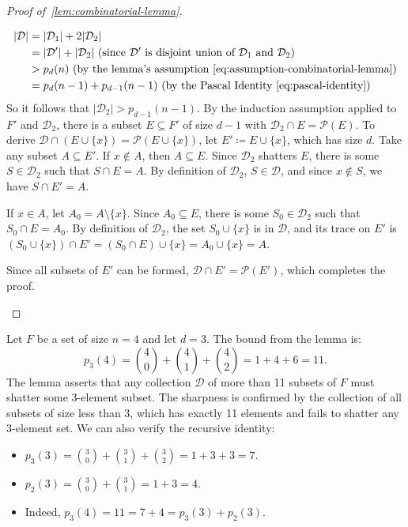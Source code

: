 \begin{proof}[Proof of~\ref{lem:combinatorial-lemma}]
\begin{enumerate}[label=(\roman*)]
\[\begin{aligned}
                |\mathcal{D}| &= |\mathcal{D}_1| + 2|\mathcal{D}_2| \\
                &= |\mathcal{D}'| + |\mathcal{D}_2| \textrm{ (since $\mathcal{D}'$ is disjoint union of $\mathcal{D}_1$ and $\mathcal{D}_2$)} \\
                &> p_d(n) \textrm{ (by the lemma's assumption~\ref{eq:assumption-combinatorial-lemma})} \\
                &= p_d(n-1) + p_{d-1}(n-1) \textrm{ (by the Pascal Identity~\ref{eq:pascal-identity})} \\
            \end{aligned}
        \]
        So it follows that $|\mathcal{D}_2| > p_{d-1}(n-1)$. By the induction assumption applied to $F'$ and $\mathcal{D}_2$, there is a subset $E \subseteq F'$ of size $d-1$ with $\mathcal{D}_2 \cap E = \mathcal{P}(E)$. To derive $\mathcal{D} \cap (E \cup \{x\}) = \mathcal{P}(E \cup \{x\})$, let $E' \coloneq E \cup \{x\}$, which has size $d$. Take any subset $A \subseteq E'$.
        If $x \notin A$, then $A \subseteq E$. Since $\mathcal{D}_2$ shatters $E$, there is some $S \in \mathcal{D}_2$ such that $S \cap E = A$. By definition of $\mathcal{D}_2$, $S \in \mathcal{D}$, and since $x \notin S$, we have $S \cap E' = A$.

        If $x \in A$, let $A_0 = A \setminus \{x\}$. Since $A_0 \subseteq E$, there is some $S_0 \in \mathcal{D}_2$ such that $S_0 \cap E = A_0$. By definition of $\mathcal{D}_2$, the set $S_0 \cup \{x\}$ is in $\mathcal{D}$, and its trace on $E'$ is $(S_0 \cup \{x\}) \cap E' = (S_0 \cap E) \cup \{x\} = A_0 \cup \{x\} = A$.

        Since all subsets of $E'$ can be formed, $\mathcal{D} \cap E' = \mathcal{P}(E')$, which completes the proof.
    \end{enumerate}
\end{proof}

\begin{example}
    Let $F$ be a set of size $n=4$ and let $d=3$. The bound from the lemma is:
    \[
        p_3(4) = \binom{4}{0} + \binom{4}{1} + \binom{4}{2} = 1 + 4 + 6 = 11.
    \]
    The lemma asserts that any collection $\mathcal{D}$ of more than 11 subsets of $F$ must shatter some 3-element subset. The sharpness is confirmed by the collection of all subsets of size less than 3, which has exactly 11 elements and fails to shatter any 3-element set. We can also verify the recursive identity:
    \begin{itemize}
        \item $p_3(3) = \binom{3}{0} + \binom{3}{1} + \binom{3}{2} = 1 + 3 + 3 = 7$.
        \item $p_2(3) = \binom{3}{0} + \binom{3}{1} = 1 + 3 = 4$.
        \item Indeed, $p_3(4) = 11 = 7 + 4 = p_3(3) + p_2(3)$.
    \end{itemize}
\end{example}

